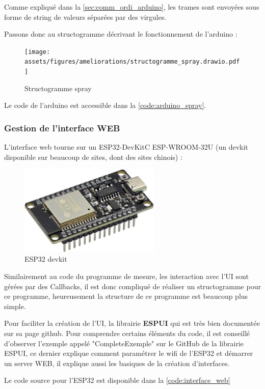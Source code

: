 Comme expliqué dans la \autoref{sec:comm_ordi_arduino}, les trames sont envoyées sous forme de string de valeurs séparées par des virgules.

Passons donc au structogramme décrivant le fonctionnement de l'arduino :
\begin{figure}[H]
    \centering
    \texttt{[image: assets/figures/ameliorations/structogramme\_spray.drawio.pdf]}
    \caption{Structogramme spray}
\end{figure}
Le code de l'arduino est accessible dans la \autoref{code:arduino_spray}.

\newpage
\subsubsection{Gestion de l'interface WEB}
L'interface web tourne sur un ESP32-DevKitC ESP-WROOM-32U (un devkit disponible sur beaucoup de sites, dont des sites chinois) :
\begin{figure}[H]
    \centering
    \includegraphics[page = 1, width = 0.6\textwidth]{assets/figures/ameliorations/ESP32_devkit.jpg}
    \caption{ESP32 devkit}
\end{figure}

Similairement au code du programme de mesure, les interaction avec l'UI sont gérées par des Callbacks, il est donc compliqué de réaliser un structogramme pour ce programme, heureusement la structure de ce programme est beaucoup
plus simple.

Pour faciliter la création de l'UI, la librairie \textbf{ESPUI}\cite{ESPUI}\footnotemark{} qui est très bien
documentée sur sa page github. Pour comprendre certains éléments du code, il est conseillé d'observer l'exemple appelé "CompleteExemple" sur le GitHub de la librairie ESPUI, ce dernier explique comment paramétrer le wifi de l'ESP32 et démarrer
un server WEB, il explique aussi les basiques de la création d'interfaces.

Le code source pour l'ESP32 est disponible dans la \autoref{code:interface_web}